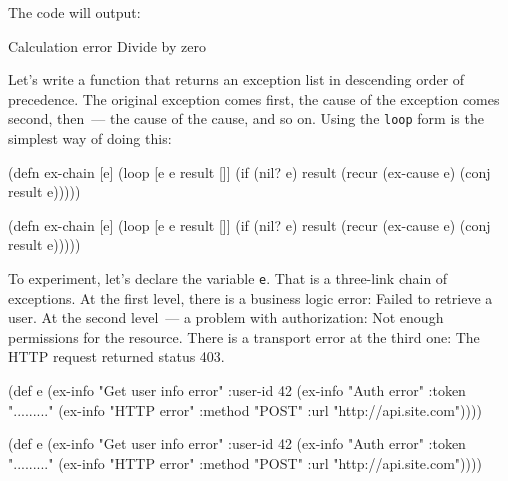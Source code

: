 \fi

\noindent
The code will output:

\begin{text}
Calculation error
Divide by zero
\end{text}

Let's write a function that returns an exception list in descending order of precedence. The original exception comes first, the cause of the exception comes second, then~--- the cause of the cause, and so on. Using the \verb|loop| form is the simplest way of doing this:


\ifx\DEVICETYPE\MOBILE

\begin{clojure}
(defn ex-chain [e]
  (loop [e e
         result []]
    (if (nil? e)
      result
      (recur (ex-cause e)
        (conj result e)))))
\end{clojure}

\else

\begin{clojure}
(defn ex-chain [e]
  (loop [e e
         result []]
    (if (nil? e)
      result
      (recur (ex-cause e) (conj result e)))))
\end{clojure}

\fi

To experiment, let's declare the variable \verb|e|. That is a three-link chain of exceptions. At the first level, there is a business logic error: Failed to retrieve a user. At the second level~--- a problem with authorization: Not enough permissions for the resource. There is a transport error at the third one: The HTTP request returned status 403.

\label{e-sample}

\ifx\DEVICETYPE\MOBILE

\begin{clojure}
(def e
  (ex-info
   "Get user info error"
   {:user-id 42}
   (ex-info
     "Auth error"
     {:token "........."}
     (ex-info
       "HTTP error"
       {:method "POST"
        :url "http://api.site.com"}))))
\end{clojure}

\else

\begin{clojure}
(def e
  (ex-info
   "Get user info error"
   {:user-id 42}
   (ex-info "Auth error"
            {:token "........."}
            (ex-info "HTTP error"
                     {:method "POST"
                      :url "http://api.site.com"}))))
\end{clojure}


